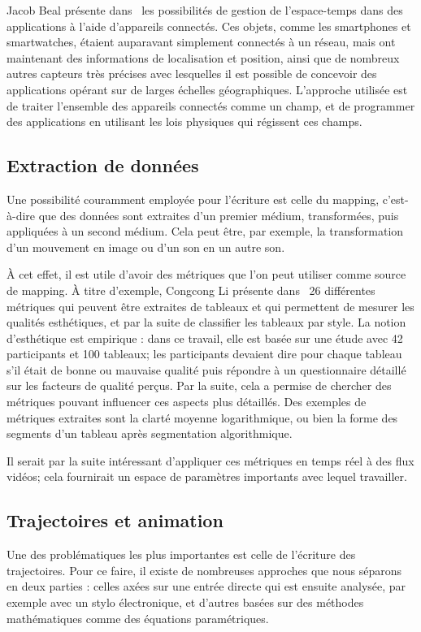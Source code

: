 \documentclass[french,12pt]{article}
\begin{document}
Jacob Beal présente dans~\cite{beal_spacetime_2015} les possibilités de gestion de l'espace-temps dans des applications à l'aide d'appareils connectés. Ces objets, comme les smartphones et smartwatches, étaient auparavant simplement connectés à un réseau, mais ont maintenant des informations de localisation et position, ainsi que de nombreux autres capteurs très précises avec lesquelles il est possible de concevoir des applications opérant sur de larges échelles géographiques. L'approche utilisée est de traiter l'ensemble des appareils connectés comme un champ, et de programmer des applications en utilisant les lois physiques qui régissent ces champs.

\subsection{Extraction de données}
Une possibilité couramment employée pour l'écriture est celle du mapping, c'est-à-dire que des données sont extraites d'un premier médium, transformées, puis appliquées à un second médium. Cela peut être, par exemple, la transformation d'un mouvement en image ou d'un son en un autre son.

À cet effet, il est utile d'avoir des métriques que l'on peut utiliser comme source de mapping. À titre d'exemple, Congcong Li présente dans~\cite{li_aesthetic_2009} 26 différentes métriques qui peuvent être extraites de tableaux et qui permettent de mesurer les qualités esthétiques, et par la suite de classifier les tableaux par style. La notion d'esthétique est empirique : dans ce travail, elle est basée sur une étude avec 42 participants et 100 tableaux; les participants devaient dire pour chaque tableau s'il était de bonne ou mauvaise qualité puis répondre à un questionnaire détaillé sur les facteurs de qualité perçus. Par la suite, cela a permise de chercher des métriques pouvant influencer ces aspects plus détaillés.
Des exemples de métriques extraites sont la clarté moyenne logarithmique, ou bien la forme des segments d'un tableau après segmentation algorithmique.

Il serait par la suite intéressant d'appliquer ces métriques en temps réel à des flux vidéos; cela fournirait un espace de paramètres importants avec lequel travailler. 

\subsection{Trajectoires et animation}
Une des problématiques les plus importantes est celle de l'écriture des trajectoires. Pour ce faire, il existe de nombreuses approches que nous séparons en deux parties : celles axées sur une entrée directe qui est ensuite analysée, par exemple avec un stylo électronique, et d'autres basées sur des méthodes mathématiques comme des équations paramétriques.
\end{document}
